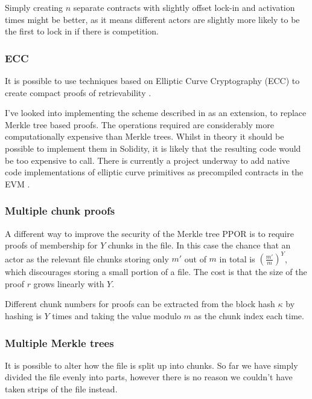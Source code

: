 \documentclass[10pt,twoside,a4paper]{article}
\begin{document}
Simply creating $n$ separate contracts with slightly offset lock-in and activation times might be better, as it means different actors are slightly more
likely to be the first to lock in if there is competition.


\subsubsection{ECC}

It is possible to use techniques based on Elliptic Curve Cryptography (ECC) to create compact proofs of retrievability \cite{ecc-por}.

I've looked into implementing the scheme described in \cite{ecc-por} as an extension, to replace Merkle tree based proofs.
The operations required are considerably more computationally expensive than Merkle trees.
Whilst in theory it should be possible to implement them in Solidity, it is likely that the resulting code would be too expensive to call.
There is currently a project underway to add native code implementations of elliptic curve primitives
as precompiled contracts in the EVM \cite{eip-ecc}.


\subsubsection{Multiple chunk proofs} \label{multi-chunk}

A different way to improve the security of the Merkle tree PPOR is to require proofs of membership for $Y$ chunks in the file.
In this case the chance that an actor as the relevant file chunks storing only $m'$ out of $m$ in total is $\left(\frac{m'}{m}\right)^Y$,
which discourages storing a small portion of a file.
The cost is that the size of the proof $r$ grows linearly with $Y$.

Different chunk numbers for proofs can be extracted from the block hash $\kappa$ by hashing is $Y$ times and taking the value modulo $m$
as the chunk index each time.

\subsubsection{Multiple Merkle trees}

It is possible to alter how the file is split up into chunks. So far we have simply divided the file evenly into parts, however there is no reason we couldn't have taken strips of the file instead.
\end{document}
